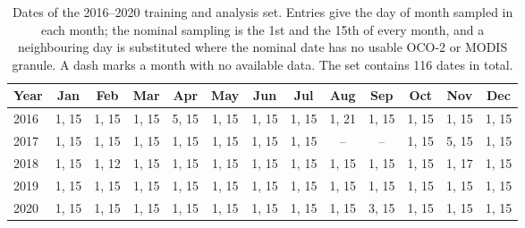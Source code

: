 %
%
%

\begin{table}[t]
\centering
\caption{Dates of the 2016--2020 training and analysis set. Entries give the
day of month sampled in each month; the nominal sampling is the 1st and the
15th of every month, and a neighbouring day is substituted where the nominal
date has no usable OCO-2 or MODIS granule. A dash marks a month with no
available data. The set contains 116 dates in total.}
\label{tab:dates_training}
\setlength{\tabcolsep}{3.2pt}
\footnotesize
\begin{tabular}{@{}lcccccccccccc@{}}
\toprule
Year & Jan & Feb & Mar & Apr & May & Jun & Jul & Aug & Sep & Oct & Nov & Dec \\
\midrule
2016 & 1, 15 & 1, 15 & 1, 15 & 5, 15 & 1, 15 & 1, 15 & 1, 15 & 1, 21 & 1, 15 & 1, 15 & 1, 15 & 1, 15 \\
2017 & 1, 15 & 1, 15 & 1, 15 & 1, 15 & 1, 15 & 1, 15 & 1, 15 & -- & -- & 1, 15 & 5, 15 & 1, 15 \\
2018 & 1, 15 & 1, 12 & 1, 15 & 1, 15 & 1, 15 & 1, 15 & 1, 15 & 1, 15 & 1, 15 & 1, 15 & 1, 17 & 1, 15 \\
2019 & 1, 15 & 1, 15 & 1, 15 & 1, 15 & 1, 15 & 1, 15 & 1, 15 & 1, 15 & 1, 15 & 1, 15 & 1, 15 & 1, 15 \\
2020 & 1, 15 & 1, 15 & 1, 15 & 1, 15 & 1, 15 & 1, 15 & 1, 15 & 1, 15 & 3, 15 & 1, 15 & 1, 15 & 1, 15 \\
\bottomrule
\end{tabular}
\end{table}

